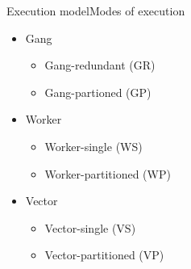 \documentclass[12pt,aspectratio=169]{beamer}
\begin{document}
\begin{frame}{Execution model}{Modes of execution}
  \begin{itemize}
  \item Gang
    \begin{itemize}
    \item Gang-redundant (GR)
    \item Gang-partioned (GP)
    \end{itemize}
  \item Worker
    \begin{itemize}
    \item Worker-single (WS)
    \item Worker-partitioned (WP)
    \end{itemize}
  \item Vector
    \begin{itemize}
    \item Vector-single (VS)
    \item Vector-partitioned (VP)
    \end{itemize}
  \end{itemize}
\end{frame}
\end{document}
